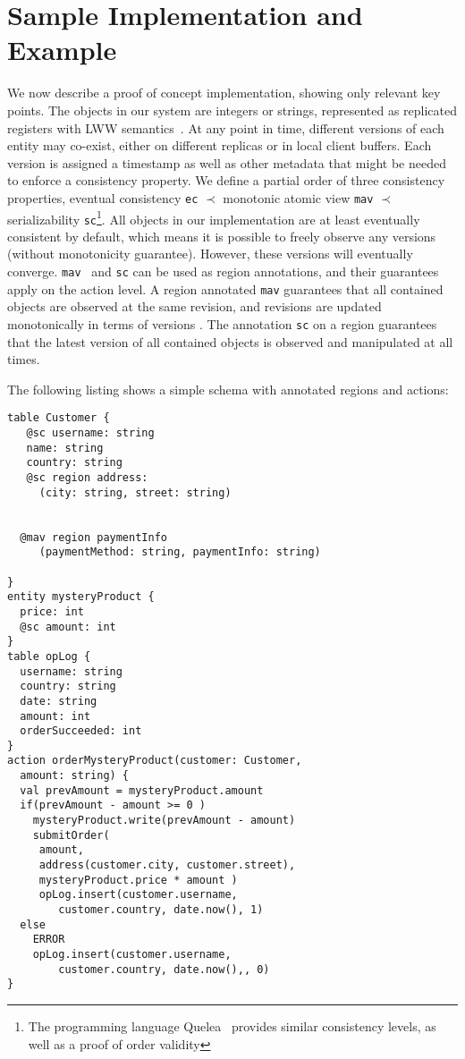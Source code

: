 \documentclass[preprint,numbers]{sigplanconf}
\begin{document}
\section{Sample Implementation and Example}
We now describe a proof of concept implementation, showing only
relevant key points. The objects in our system are integers or strings, represented as replicated registers with LWW
semantics~\cite{burckhardt2014replicated}. At any point in time, different
versions of each entity may
co-exist, either on different replicas or in local client buffers. Each version
is assigned a timestamp as well as other metadata that might be needed to
enforce a consistency property. We define a partial order of three consistency properties, eventual
consistency \texttt{ec} $\prec$ monotonic atomic view \texttt{mav} $\prec$
serializability \texttt{sc}\footnote{The programming language Quelea~\cite{sivaramakrishnan2015declarative} provides similar
  consistency levels, as well as a proof of order validity}. All
objects in our implementation are at least eventually consistent by default, which means it
is possible to freely observe any versions (without monotonicity guarantee).
However, these versions will eventually converge. \texttt{mav}~\cite{bailis2013highly} and \texttt{sc}
can be used as region annotations, and their guarantees apply on the action
level. A region annotated \texttt{mav} guarantees that all contained objects
are observed at the same revision, and revisions are updated monotonically in
terms of versions . The annotation \texttt{sc} on a
region guarantees that the latest version of all
contained objects is observed and manipulated at all times. 

The following listing shows a simple schema with annotated regions and actions:
\begin{lstlisting}[basicstyle=\small]
table Customer {
   @sc username: string
   name: string 
   country: string
   @sc region address: 
     (city: string, street: string)
     
   
  @mav region paymentInfo 
     (paymentMethod: string, paymentInfo: string)

}
entity mysteryProduct {
  price: int
  @sc amount: int
}
table opLog {
  username: string
  country: string
  date: string
  amount: int
  orderSucceeded: int
}
action orderMysteryProduct(customer: Customer,
  amount: string) {
  val prevAmount = mysteryProduct.amount
  if(prevAmount - amount >= 0 )
    mysteryProduct.write(prevAmount - amount)
    submitOrder(
     amount, 
     address(customer.city, customer.street), 
     mysteryProduct.price * amount )
     opLog.insert(customer.username, 
        customer.country, date.now(), 1)
  else 
    ERROR
    opLog.insert(customer.username, 
        customer.country, date.now(),, 0)
}
\end{lstlisting}
\end{document}
